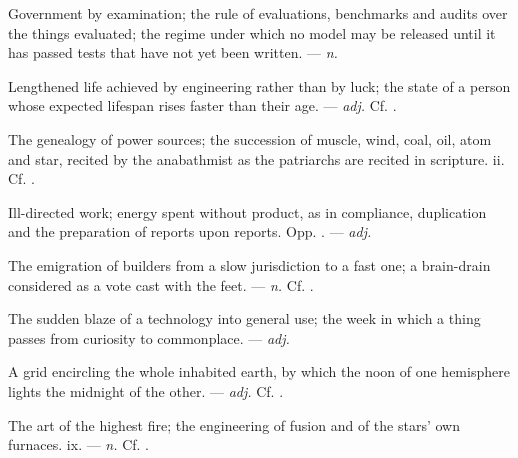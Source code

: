  Government by examination;  the rule of evaluations, benchmarks and audits over the things evaluated;   the regime under which no model may be released until it has passed tests that have not yet been written.   ---  \textit{n.}

 Lengthened life achieved by engineering rather than by luck; the state of a person whose expected lifespan rises faster than their age.  ---  \textit{adj.} Cf. .

 The genealogy of power sources; the succession of muscle, wind, coal, oil, atom and star, recited by the anabathmist as the patriarchs are recited in scripture.  ii. Cf. .

 Ill-directed work; energy spent without product, as in compliance, duplication and the preparation of reports upon reports. Opp. . ---  \textit{adj.}

 The emigration of builders from a slow jurisdiction to a fast one; a brain-drain considered as a vote cast with the feet.   ---  \textit{n.} Cf. .

 The sudden blaze of a technology into general use; the week in which a thing passes from curiosity to commonplace.  ---  \textit{adj.}

 A grid encircling the whole inhabited earth, by which the noon of one hemisphere lights the midnight of the other. ---  \textit{adj.} Cf. .

 The art of the highest fire; the engineering of fusion and of the stars' own furnaces.   ix. ---  \textit{n.} Cf. .

